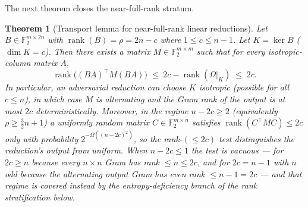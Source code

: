 \documentclass[11pt,a4paper]{article}
\theoremstyle{plain}
\newtheorem{theorem}{Theorem}[section]
\theoremstyle{definition}
\newcommand{\F}{\mathbb{F}}
\begin{document}
The next theorem closes the near-full-rank stratum.

\begin{theorem}[Transport lemma for near-full-rank linear reductions]
\label{thm:transport-nearfull}
Let $B \in \F_2^{m \times 2n}$ with $\operatorname{rank}(B) = \rho = 2n-c$ where $1 \le c \le n-1$. Let $K = \ker B$ ($\dim K = c$). Then there exists a matrix $M \in \F_2^{m \times m}$ such that for every isotropic-column matrix $A$,
\[
\operatorname{rank}\bigl((BA)^{\top} M (BA)\bigr) \;\le\; 2c - \operatorname{rank}(\Omega|_K) \;\le\; 2c.
\]
In particular, an adversarial reduction can choose $K$ isotropic (possible for all $c \le n$), in which case $M$ is alternating and the Gram rank of the output is at most $2c$ deterministically. Moreover, in the regime $n - 2c \ge 2$ (equivalently $\rho \ge \tfrac{3}{2}n + 1$) a uniformly random matrix $C \in \F_2^{m \times n}$ satisfies $\operatorname{rank}(C^{\top} M C) \le 2c$ only with probability $2^{-\Omega((n-2c)^2)}$, so the rank-$(\le\!2c)$ test distinguishes the reduction's output from uniform. When $n - 2c \le 1$ the test is vacuous --- for $2c \ge n$ because every $n \times n$ Gram has rank $\le n \le 2c$, and for $2c = n-1$ with $n$ odd because the \emph{alternating} output Gram has even rank $\le n-1 = 2c$ --- and that regime is covered instead by the entropy-deficiency branch of the rank stratification below.
\end{theorem}
\end{document}
